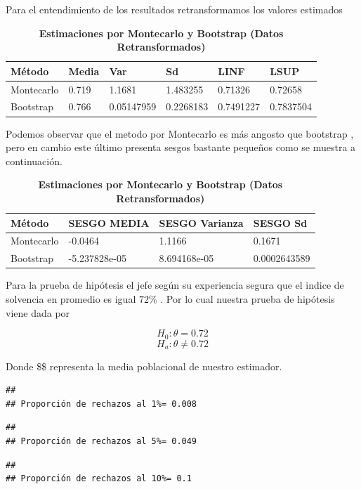 \documentclass[
]{article}
\begin{document}
Para el entendimiento de los resultados retransformamos los valores
estimados

\begin{table}[!h]
    \centering
    \caption{\textbf{Estimaciones por Montecarlo y Bootstrap (Datos Retransformados)}}
    \begin{tabular}{|l|l|l|l|l|l|}
    \hline
        Método & Media & Var & Sd & LINF & LSUP \\ \hline
        Montecarlo & 0.719 & 1.1681 & 1.483255 & 0.71326 & 0.72658 \\ \hline
        Bootstrap & 0.766 & 0.05147959 & 0.2268183 & 0.7491227 & 0.7837504 \\ \hline
    \end{tabular}
\end{table}

Podemos observar que el metodo por Montecarlo es más angosto que
bootstrap , pero en cambio este último presenta sesgos bastante pequeños
como se muestra a continuación.

\begin{table}[!h]
    \centering
    \caption{\textbf{Estimaciones por Montecarlo y Bootstrap (Datos Retransformados)}}
    \begin{tabular}{|l|l|l|l|}
    \hline
        Método & SESGO MEDIA & SESGO Varianza & SESGO Sd  \\ \hline
        Montecarlo & -0.0464 & 1.1166 & 0.1671 \\ \hline
        Bootstrap & -5.237828e-05 & 8.694168e-05  & 0.0002643589 \\ \hline
    \end{tabular}
\end{table}

Para la prueba de hipótesis el jefe según su experiencia segura que el
indice de solvencia en promedio es igual \(72\%\) . Por lo cual nuestra
prueba de hipótesis viene dada por

\[ H_0: \theta = 0.72 \] \[ H_a: \theta \neq 0.72 \]

Donde \$\theta \$ representa la media poblacional de nuestro estimador.

\begin{verbatim}
## 
## Proporción de rechazos al 1%= 0.008
\end{verbatim}

\begin{verbatim}
## 
## Proporción de rechazos al 5%= 0.049
\end{verbatim}

\begin{verbatim}
## 
## Proporción de rechazos al 10%= 0.1
\end{verbatim}
\end{document}
